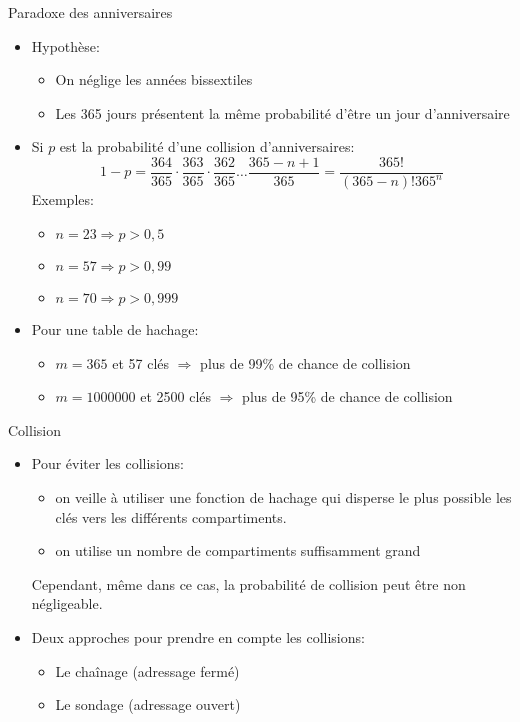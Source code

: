 \begin{frame}{Paradoxe des anniversaires}

\begin{itemize}
\item Hypothèse:
\begin{itemize}
\item On néglige les années bissextiles
\item Les 365 jours présentent la même probabilité d'être un jour d'anniversaire
\end{itemize}
\item Si $p$ est la probabilité d'une collision d'anniversaires:
$$1-p = \frac{364}{365} \cdot \frac{363}{365} \cdot \frac{362}{365} \ldots \frac{365-n+1}{365} = \frac{365!}{(365-n)! 365^n}$$
Exemples:
\begin{itemize}
\item $n=23 \Rightarrow p>0,5$
\item $n=57 \Rightarrow p>0,99$
\item $n=70 \Rightarrow p>0,999$
\end{itemize}
\bigskip

\item Pour une table de hachage:
\begin{itemize}
\item $m=365$ et 57 clés $\Rightarrow$ plus de 99\% de chance de collision
\item $m=1000000$ et 2500 clés $\Rightarrow$ plus de 95\% de chance de collision
\end{itemize}
\end{itemize}
\end{frame}

\begin{frame}{Collision}

\begin{itemize}
\item Pour éviter les collisions:
\begin{itemize}
\item on veille à utiliser une fonction de hachage qui disperse le
  plus possible les clés vers les différents compartiments.
\item on utilise un nombre de compartiments suffisamment grand
\end{itemize}
Cependant, même dans ce cas, la probabilité de collision peut
  être non négligeable.

\bigskip

\item Deux approches pour prendre en compte les collisions:
\begin{itemize}
\item Le chaînage (adressage fermé)
\item Le sondage (adressage ouvert)
\end{itemize}
\end{itemize}


\end{frame}


